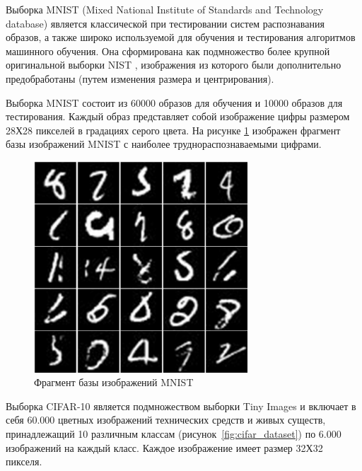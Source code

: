 Выборка MNIST (Mixed National Institute of Standards and Technology database) является классической при тестировании систем распознавания образов, а также широко используемой для обучения и тестирования алгоритмов машинного обучения. Она сформирована как подмножество более крупной оригинальной выборки NIST \cite{mnist}, изображения из которого были дополнительно предобработаны (путем изменения размера и центрирования). 

Выборка MNIST состоит из 60000 образов для обучения и 10000 образов для тестирования. Каждый образ представляет собой изображение цифры размером 28Х28 пикселей в градациях серого цвета. На рисунке \ref{fig:mnist_example} изображен фрагмент базы изображений MNIST с наиболее труднораспознаваемыми цифрами.

\begin{figure}[h]
	\begin{center}
		\includegraphics[width=8cm]{man-source/images/ch3/pic3-12.pdf}
		\caption{Фрагмент базы изображений MNIST}		
		\label{fig:mnist_example}
	\end{center}
\end{figure}

Выборка CIFAR-10 \cite{krizhevsky2009learning} является подмножеством выборки Tiny Images \cite{torralba2008} и включает в себя 60.000 цветных изображений технических средств и живых существ, принадлежащий 10 различным классам (рисунок~\ref{fig:cifar_dataset}) по 6.000 изображений на каждый класс. Каждое изображение имеет размер 32Х32 пикселя.

